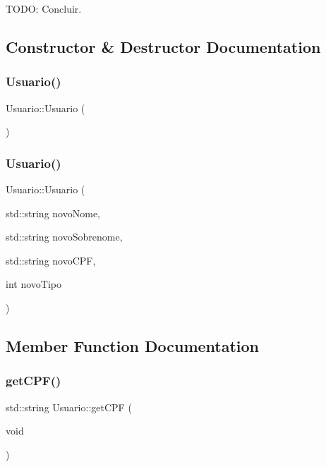 T\+O\+DO\+: Concluir. 

\subsection{Constructor \& Destructor Documentation}
\mbox{\label{class_usuario_aa85a5371a098dfba5449140d9b8a472f}} 
\subsubsection{Usuario()\hspace{0.1cm}{\footnotesize\ttfamily [1/2]}}
{\footnotesize\ttfamily Usuario\+::\+Usuario (\begin{DoxyParamCaption}{ }\end{DoxyParamCaption})\hspace{0.3cm}{\ttfamily [inline]}}

\mbox{\label{class_usuario_a1d0d6b61cd9e1afe71aee612739a3219}} 
\subsubsection{Usuario()\hspace{0.1cm}{\footnotesize\ttfamily [2/2]}}
{\footnotesize\ttfamily Usuario\+::\+Usuario (\begin{DoxyParamCaption}\item[{std\+::string}]{novo\+Nome,  }\item[{std\+::string}]{novo\+Sobrenome,  }\item[{std\+::string}]{novo\+C\+PF,  }\item[{int}]{novo\+Tipo }\end{DoxyParamCaption})\hspace{0.3cm}{\ttfamily [inline]}}



\subsection{Member Function Documentation}
\mbox{\label{class_usuario_a6b44376f453134195f798e16477514b0}} 
\subsubsection{get\+C\+P\+F()}
{\footnotesize\ttfamily std\+::string Usuario\+::get\+C\+PF (\begin{DoxyParamCaption}\item[{void}]{ }\end{DoxyParamCaption})\hspace{0.3cm}{\ttfamily [inline]}}

